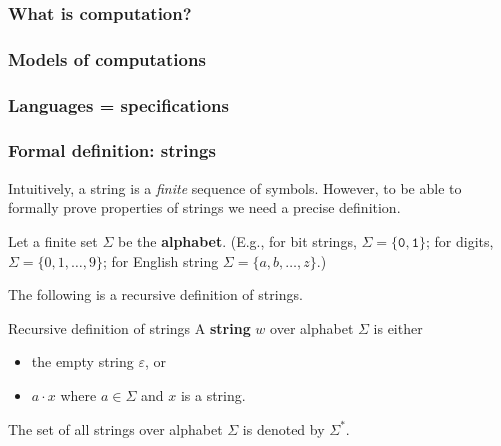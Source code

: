 

\newcommand\sbullet[1][.5]{\mathbin{\vcenter{\hbox{\scalebox{#1}{$\bullet$}}}}}

\renewcommand{\epsilon}{\varepsilon}

\newcommand{\czero}{{\mathtt 0}}
\newcommand{\cone}{{\mathtt 1}}

\begin{frame}
  \frametitle{What is computation?}
\end{frame}

\begin{frame}
  \frametitle{Models of computations}
\end{frame}

\begin{frame}
  \frametitle{Languages = specifications}
\end{frame}

\begin{frame}
  \frametitle{Formal definition: strings}

  Intuitively, a string is a {\em finite} sequence of symbols.
  However, to be able to formally prove properties of strings we need
  a precise definition.

  \vspace{0.1in}
  
  Let a finite set $\Sigma$ be the {\color{red}\bf alphabet}. (E.g.,
  for bit strings, $\Sigma=\{\czero,\cone\}$; for digits,
  $\Sigma=\{0,1,\ldots,9\}$; for English string
  $\Sigma=\{a,b,\ldots,z\}$.)
  
  The following is a recursive definition of strings.

  \begin{block}{Recursive definition of strings}
    A {\color{red} \bf string} $w$ over alphabet $\Sigma$ is either
    \begin{itemize}
    \item the empty string $\epsilon$, or
    \item $a\cdot x$ where $a\in\Sigma$ and $x$ is a string.
    \end{itemize}
  \end{block}

  \vspace{0.1in}

  The set of all strings over alphabet $\Sigma$ is denoted by $\Sigma^*$.
\end{frame}

